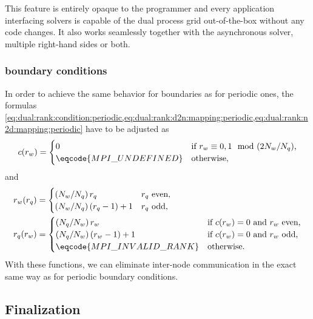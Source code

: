This feature is entirely opaque to the programmer and every application interfacing \quda solvers is capable of the dual process grid out-of-the-box without any code changes.
It also works seamlessly together with the asynchronous solver, multiple right-hand sides or both.

\subsubsection{\CstarHeading boundary conditions}

In order to achieve the same behavior for \Cstar boundaries as for periodic ones, the formulas \cref{eq:dual:rank:condition:periodic,eq:dual:rank:d2n:mapping:periodic,eq:dual:rank:n2d:mapping:periodic} have to be adjusted as
\begin{equation} \label{eq:dual:rank:condition:cstar}
c(r_w) = \begin{cases}
  0                         & \text{if $r_w \equiv 0,1 \mod (2 N_w / N_q)$,} \\
  \eqcode{MPI\_UNDEFINED}   & \text{otherwise},
\end{cases}
\end{equation}
and
\begin{align}
r_w(r_q) &=
\begin{cases}
  \left( N_w / N_q \right) r_q         & \text{$r_q$ even,} \\
  \left( N_w / N_q \right) (r_q-1)+1   & \text{$r_q$ odd,}
\end{cases} \label{eq:dual:rank:d2n:mapping:cstar} \\
r_q(r_w) &= 
\begin{cases}
  \left( N_q / N_w \right) r_w         & \text{if $c(r_w)=0$ and $r_w$ even,} \\
  \left( N_q / N_w \right) (r_w-1)+1   & \text{if $c(r_w)=0$ and $r_w$ odd,} \\
  \eqcode{MPI\_INVALID\_RANK}          & \text{otherwise.}
\end{cases} \label{eq:dual:rank:n2d:mapping:cstar}
\end{align}
With these functions, we can eliminate inter-node communication in the exact same way as for periodic boundary conditions.

\subsection{Finalization}
\label{sec:interface:openqxd:finalize}

